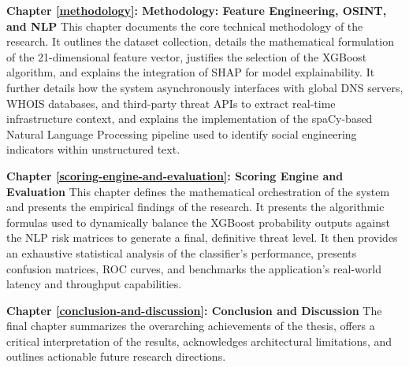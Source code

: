 \textbf{Chapter \ref{methodology}: Methodology: Feature Engineering, OSINT, and NLP} This chapter documents the core technical methodology of the research. It outlines the dataset collection, details the mathematical formulation of the 21-dimensional feature vector, justifies the selection of the XGBoost algorithm, and explains the integration of SHAP for model explainability. It further details how the system asynchronously interfaces with global DNS servers, WHOIS databases, and third-party threat APIs to extract real-time infrastructure context, and explains the implementation of the spaCy-based Natural Language Processing pipeline used to identify social engineering indicators within unstructured text.

\textbf{Chapter \ref{scoring-engine-and-evaluation}: Scoring Engine and Evaluation} This chapter defines the mathematical orchestration of the system and presents the empirical findings of the research. It presents the algorithmic formulas used to dynamically balance the XGBoost probability outputs against the NLP risk matrices to generate a final, definitive threat level. It then provides an exhaustive statistical analysis of the classifier's performance, presents confusion matrices, ROC curves, and benchmarks the application's real-world latency and throughput capabilities.

\textbf{Chapter \ref{conclusion-and-discussion}: Conclusion and Discussion} The final chapter summarizes the overarching achievements of the thesis, offers a critical interpretation of the results, acknowledges architectural limitations, and outlines actionable future research directions.

